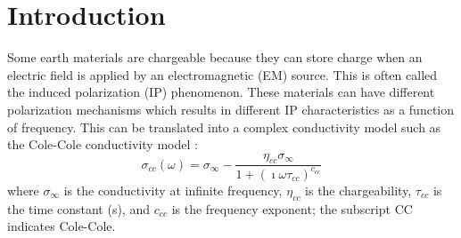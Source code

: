 \documentclass[manuscript]{geophysics}
\newcommand{\siginf}{\sigma_\infty}
\begin{document}
\renewcommand{\figdir}{./figures} %



\section{Introduction}
Some earth  materials  are chargeable because they can store charge when an electric field is applied by an electromagnetic (EM) source. This is often called the induced polarization (IP) phenomenon. These materials can have different polarization mechanisms which results in different IP characteristics as a function of frequency. This can be translated into a complex conductivity model such as the Cole-Cole conductivity model \cite[]{cole1941,pelton1978,tarasov2013}:
\begin{equation}
    \sigma_{cc}(\omega) = \siginf - \frac{\eta_{cc} \siginf}{1+(\imath \omega \tau_{cc})^{c_{cc}}}
    \label{eq:colecole}
\end{equation}
where $\siginf$ is the conductivity at infinite frequency,  $\eta_{cc}$ is the chargeability, $\tau_{cc}$ is the time constant (s), and  $c_{cc}$ is the frequency exponent; the subscript CC indicates Cole-Cole.
\end{document}
